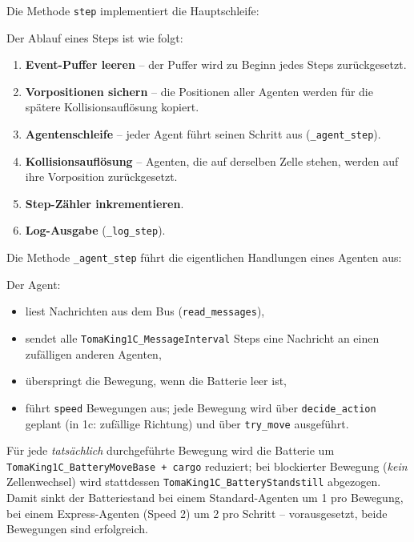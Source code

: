 Die Methode \texttt{step} implementiert die Hauptschleife:



Der Ablauf eines Steps ist wie folgt:
\begin{enumerate}
    \item \textbf{Event-Puffer leeren} – der Puffer wird zu Beginn jedes Steps zurückgesetzt.
    \item \textbf{Vorpositionen sichern} – die Positionen aller Agenten werden für die spätere Kollisionsauflösung kopiert.
    \item \textbf{Agentenschleife} – jeder Agent führt seinen Schritt aus (\texttt{\_agent\_step}).
    \item \textbf{Kollisionsauflösung} – Agenten, die auf derselben Zelle stehen, werden auf ihre Vorposition zurückgesetzt.
    \item \textbf{Step-Zähler inkrementieren}.
    \item \textbf{Log-Ausgabe} (\texttt{\_log\_step}).
\end{enumerate}

Die Methode \texttt{\_agent\_step} führt die eigentlichen Handlungen eines Agenten aus:



Der Agent:
\begin{itemize}
    \item liest Nachrichten aus dem Bus (\texttt{read\_messages}),
    \item sendet alle \texttt{TomaKing1C\_MessageInterval} Steps eine Nachricht an einen zufälligen anderen Agenten,
    \item überspringt die Bewegung, wenn die Batterie leer ist,
    \item führt \texttt{speed} Bewegungen aus; jede Bewegung wird über \texttt{decide\_action} geplant (in 1c: zufällige Richtung) und über \texttt{try\_move} ausgeführt.
\end{itemize}

Für jede \textit{tatsächlich} durchgeführte Bewegung wird die Batterie um \\ \texttt{TomaKing1C\_BatteryMoveBase + cargo} reduziert; bei blockierter Bewegung (\textit{kein} Zellenwechsel) wird stattdessen \texttt{TomaKing1C\_BatteryStandstill} abgezogen. Damit sinkt der Batteriestand bei einem Standard-Agenten um 1 pro Bewegung, bei einem Express-Agenten (Speed 2) um 2 pro Schritt -- vorausgesetzt, beide Bewegungen sind erfolgreich.

